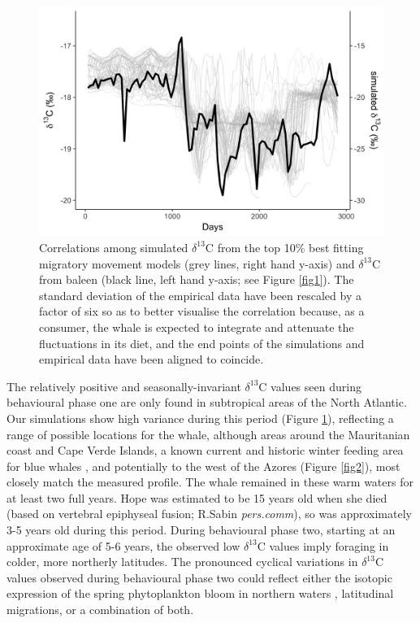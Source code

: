 \documentclass[a4paper,12pt]{article}
\begin{document}
\begin{figure}
 \centering
  \includegraphics[width = \linewidth]{figures/Figure-3-blue-sims.png}
  \caption{Correlations among simulated $\delta^{13}$C from the top 10\% best fitting migratory movement models (grey lines, right hand y-axis) and $\delta^{13}$C from baleen (black line, left hand y-axis; see Figure \ref{fig1}). 
  The standard deviation of the empirical data have been rescaled by a factor of six so as to better visualise the correlation because, as a consumer, the whale is expected to integrate and attenuate the fluctuations in its diet, and the end points of the simulations and empirical data have been aligned to coincide.}
  \label{fig3}
\end{figure}
 
The relatively positive and seasonally-invariant $\delta^{13}$C values seen during behavioural phase one are only found in subtropical areas of the North Atlantic.  
Our simulations show high variance during this period (Figure \ref{fig3}), reflecting a range of possible locations for the whale, although areas around the Mauritanian coast and Cape Verde Islands, a known current and historic winter feeding area for blue whales \cite{baines2014upwellings,reeves2004historical}, and potentially to the west of the Azores (Figure \ref{fig2}), most closely match the measured profile. 
The whale remained in these warm waters for at least two full years. 
Hope was estimated to be 15 years old when she died (based on vertebral epiphyseal fusion; R.Sabin \textit{pers.comm}), so was approximately 3-5 years old during this period.
During behavioural phase two, starting at an approximate age of 5-6 years, the observed low $\delta^{13}$C values imply foraging in colder, more northerly latitudes. 
The pronounced cyclical variations in $\delta^{13}$C values observed during behavioural phase two could reflect either the isotopic expression of the spring phytoplankton bloom in northern waters \cite{magozzi2017using}, latitudinal migrations, or a combination of both.  
\end{document}
